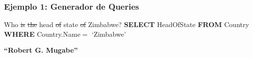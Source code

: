 









\begin{frame}[t]
\frametitle{Ejemplo 1: Generador de Queries}
\Large{{\color{blue}Who} \st{is} \st{the} {\color{blue}head} \st{of} {\color{blue}state} \st{of} {\color{red}Zimbabwe}? 
\bigskip
\newline
\textbf{{\color{purple}SELECT}} HeadOfState \newline
{\color{purple}\textbf{FROM}} Country \newline
{\color{purple}\textbf{WHERE}} Country.Name$=$ {\color{green}`Zimbabwe'}
}

\bigskip

\textbf{``Robert G. Mugabe''}

\end{frame}



